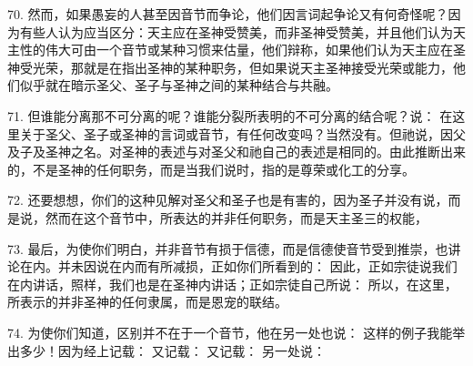 \par

70. 然而，如果愚妄的人甚至因音节而争论，他们因言词起争论又有何奇怪呢？因为有些人认为应当区分：天主应在圣神受赞美，而非圣神受赞美，并且他们认为天主性的伟大可由一个音节或某种习惯来估量，他们辩称，如果他们认为天主应在圣神受光荣，那就是在指出圣神的某种职务，但如果说天主圣神接受光荣或能力，他们似乎就在暗示圣父、圣子与圣神之间的某种结合与共融。\par

71. 但谁能分离那不可分离的呢？谁能分裂所表明的不可分离的结合呢？说：  在这里关于圣父、圣子或圣神的言词或音节，有任何改变吗？当然没有。但祂说，因父及子及圣神之名。对圣神的表述与对圣父和祂自己的表述是相同的。由此推断出来的，不是圣神的任何职务，而是当我们说时，指的是尊荣或化工的分享。\par

72. 还要想想，你们的这种见解对圣父和圣子也是有害的，因为圣子并没有说，而是说，然而在这个音节中，所表达的并非任何职务，而是天主圣三的权能，\par

73. 最后，为使你们明白，并非音节有损于信德，而是信德使音节受到推崇，也讲论在内。并未因说在内而有所减损，正如你们所看到的：  因此，正如宗徒说我们在内讲话，照样，我们也是在圣神内讲话；正如宗徒自己所说：  所以，在这里，所表示的并非圣神的任何隶属，而是恩宠的联结。\par

74. 为使你们知道，区别并不在于一个音节，他在另一处也说：  这样的例子我能举出多少！因为经上记载：  又记载：  又记载：  另一处说： \par

